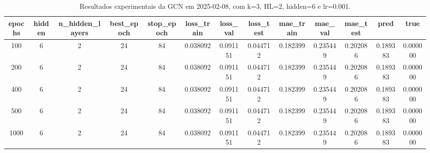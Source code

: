 \begin{table}[h]
\centering
\caption{Resultados experimentais da GCN em 2025-02-08, com k=3, HL=2, hidden=6 e lr=0.001.}
\label{tab:gcn_results_k3_hl2_h6_d20250208}
\begin{tabular}{ccccccccccccc}
\toprule
epochs & hidden & n\_hidden\_layers & best\_epoch & stop\_epoch & loss\_train & loss\_val & loss\_test & mae\_train & mae\_val & mae\_test & pred & true \\
\midrule
100 & 6 & 2 & 24 & 84 & 0.038092 & 0.091151 & 0.044712 & 0.182399 & 0.235449 & 0.202086 & 0.189383 & 0.000000 \\
200 & 6 & 2 & 24 & 84 & 0.038092 & 0.091151 & 0.044712 & 0.182399 & 0.235449 & 0.202086 & 0.189383 & 0.000000 \\
400 & 6 & 2 & 24 & 84 & 0.038092 & 0.091151 & 0.044712 & 0.182399 & 0.235449 & 0.202086 & 0.189383 & 0.000000 \\
500 & 6 & 2 & 24 & 84 & 0.038092 & 0.091151 & 0.044712 & 0.182399 & 0.235449 & 0.202086 & 0.189383 & 0.000000 \\
1000 & 6 & 2 & 24 & 84 & 0.038092 & 0.091151 & 0.044712 & 0.182399 & 0.235449 & 0.202086 & 0.189383 & 0.000000 \\
\bottomrule
\end{tabular}
\end{table}
